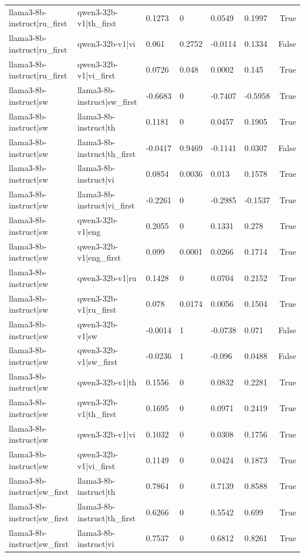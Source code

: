 \begin{table}
\begin{tabular}{llllllr}
llama3-8b-instruct|ru_first & qwen3-32b-v1|th_first & 0.1273 & 0 & 0.0549 & 0.1997 & True \\
llama3-8b-instruct|ru_first & qwen3-32b-v1|vi & 0.061 & 0.2752 & -0.0114 & 0.1334 & False \\
llama3-8b-instruct|ru_first & qwen3-32b-v1|vi_first & 0.0726 & 0.048 & 0.0002 & 0.145 & True \\
llama3-8b-instruct|sw & llama3-8b-instruct|sw_first & -0.6683 & 0 & -0.7407 & -0.5958 & True \\
llama3-8b-instruct|sw & llama3-8b-instruct|th & 0.1181 & 0 & 0.0457 & 0.1905 & True \\
llama3-8b-instruct|sw & llama3-8b-instruct|th_first & -0.0417 & 0.9469 & -0.1141 & 0.0307 & False \\
llama3-8b-instruct|sw & llama3-8b-instruct|vi & 0.0854 & 0.0036 & 0.013 & 0.1578 & True \\
llama3-8b-instruct|sw & llama3-8b-instruct|vi_first & -0.2261 & 0 & -0.2985 & -0.1537 & True \\
llama3-8b-instruct|sw & qwen3-32b-v1|eng & 0.2055 & 0 & 0.1331 & 0.278 & True \\
llama3-8b-instruct|sw & qwen3-32b-v1|eng_first & 0.099 & 0.0001 & 0.0266 & 0.1714 & True \\
llama3-8b-instruct|sw & qwen3-32b-v1|ru & 0.1428 & 0 & 0.0704 & 0.2152 & True \\
llama3-8b-instruct|sw & qwen3-32b-v1|ru_first & 0.078 & 0.0174 & 0.0056 & 0.1504 & True \\
llama3-8b-instruct|sw & qwen3-32b-v1|sw & -0.0014 & 1 & -0.0738 & 0.071 & False \\
llama3-8b-instruct|sw & qwen3-32b-v1|sw_first & -0.0236 & 1 & -0.096 & 0.0488 & False \\
llama3-8b-instruct|sw & qwen3-32b-v1|th & 0.1556 & 0 & 0.0832 & 0.2281 & True \\
llama3-8b-instruct|sw & qwen3-32b-v1|th_first & 0.1695 & 0 & 0.0971 & 0.2419 & True \\
llama3-8b-instruct|sw & qwen3-32b-v1|vi & 0.1032 & 0 & 0.0308 & 0.1756 & True \\
llama3-8b-instruct|sw & qwen3-32b-v1|vi_first & 0.1149 & 0 & 0.0424 & 0.1873 & True \\
llama3-8b-instruct|sw_first & llama3-8b-instruct|th & 0.7864 & 0 & 0.7139 & 0.8588 & True \\
llama3-8b-instruct|sw_first & llama3-8b-instruct|th_first & 0.6266 & 0 & 0.5542 & 0.699 & True \\
llama3-8b-instruct|sw_first & llama3-8b-instruct|vi & 0.7537 & 0 & 0.6812 & 0.8261 & True \\

\end{tabular}
\end{table}
